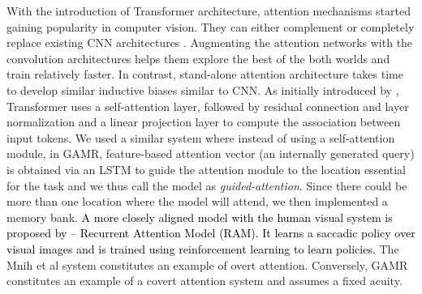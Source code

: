With the introduction of Transformer architecture, attention mechanisms started gaining popularity in computer vision. They can either complement \citep{bello2019attention,vaishnav2021understanding,d2021convit} or completely replace existing CNN architectures \citep{ramachandran2019stand,pmlr-v139-touvron21a,Dosovitskiy2020-iq}. Augmenting the attention networks with the convolution architectures helps them explore the best of the both worlds and train relatively faster. In contrast, stand-alone attention architecture takes time to develop similar inductive biases similar to CNN. As initially introduced by \citet{vaswani2017attention}, Transformer uses a self-attention layer, followed by residual connection and layer normalization and a linear projection layer to compute the association between input tokens. We used a similar system where instead of using a self-attention module, in GAMR, feature-based attention vector (an internally generated query) is obtained via an LSTM to guide the attention module to the location essential for the task and we thus call the model as \textit{guided-attention}. 
Since there could be more than one location where the model will attend, we then implemented a memory bank. \textcolor{black}{ A more closely aligned model with the human visual system is proposed by \citet{mnih2014recurrent} -- Recurrent Attention Model (RAM). It learns a saccadic policy over visual images and is trained using reinforcement learning to learn policies.} The Mnih et al system constitutes an example of overt attention. Conversely, GAMR constitutes an example of a covert attention system and assumes a fixed acuity. 


